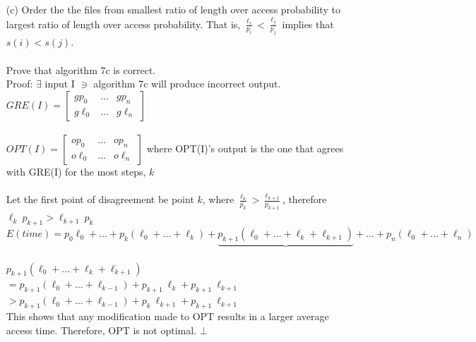 \documentclass[10pt]{article}
\begin{document}
\begin{enumerate}
		\item[(c)] Order the the files from smallest ratio of length over access probability to largest ratio of length
		over access probability. That is, $\frac{\ell_{i}}{p_{i}} < \frac{\ell_{j}}{p_{j}}$ implies that $s(i) < s(j)$.
		\\
		\\
		Prove that algorithm 7c is correct. 
		\\
		Proof: $\exists$ input I $\ni$ algorithm 7c will produce incorrect output.\\
		$GRE(I) = \left[
		\begin{array}{ccc}
		gp_{0} & \ldots & gp_{n}\\ 
		g\ell_{0} & \ldots & g\ell_{n}
		\end{array}
	 \right]$ 
	 \\
	 \\
		$OPT(I) = \left[
		\begin{array}{ccc}
		op_{0} & \ldots & op_{n}\\ 
		o\ell_{0} & \ldots & o\ell_{n}
		\end{array}
	 \right]$ where OPT(I)'s output is the one that agrees with GRE(I) for the most steps, $k$\\
	 \\
	 Let the first point of disagreement be point $k$, where $\frac{\ell_{k}}{p_{k}} > \frac{\ell_{k+1}}{p_{k+1}}$, therefore $\ell_{k}~p_{k+1} > \ell_{k+1}~p_{k}$\\
	 
	 $E(time) = p_{0}\ell_{0} + \ldots + p_{k}(\ell_{0}+\ldots+\ell_{k}) + \underbrace{p_{k+1}(\ell_{0}+\ldots+\ell_{k}+\ell_{k+1})}{} + \ldots + p_{n}(\ell_{0}+\ldots+\ell_{n})$\\
	 \\
	 $p_{k+1}(\ell_{0}+\ldots+\ell_{k}+\ell_{k+1})$\\
	 $= p_{k+1}(\ell_{0}+\ldots+\ell_{k-1}) + p_{k+1}~\ell_{k}+p_{k+1}~\ell_{k+1}$\\
	 $> p_{k+1}(\ell_{0}+\ldots+\ell_{k-1}) + p_{k}~\ell_{k+1}+p_{k+1}~\ell_{k+1}$
	 \\
	 This shows that any modification made to OPT results in a larger average access time. Therefore, OPT is not optimal. $\bot$
	 
	\end{enumerate}
\end{document}
